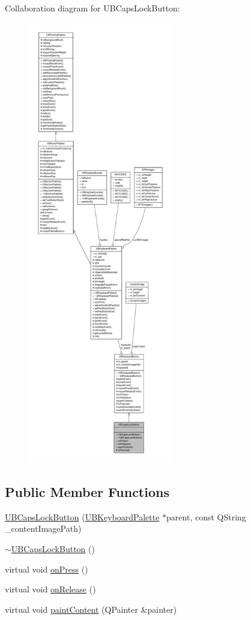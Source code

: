 Collaboration diagram for U\-B\-Caps\-Lock\-Button\-:
\nopagebreak
\begin{figure}[H]
\begin{center}
\leavevmode
\includegraphics[height=550pt]{db/dcd/class_u_b_caps_lock_button__coll__graph}
\end{center}
\end{figure}
\subsection*{Public Member Functions}
\begin{DoxyCompactItemize}
\item 
\hyperlink{class_u_b_caps_lock_button_a9f47840ffe36b462f52e9a4841357e2d}{U\-B\-Caps\-Lock\-Button} (\hyperlink{class_u_b_keyboard_palette}{U\-B\-Keyboard\-Palette} $\ast$parent, const Q\-String \-\_\-content\-Image\-Path)
\item 
\hyperlink{class_u_b_caps_lock_button_abbb3cad7eb8a461b63e0bab6a7cf0701}{$\sim$\-U\-B\-Caps\-Lock\-Button} ()
\item 
virtual void \hyperlink{class_u_b_caps_lock_button_a2ae615a22acf4dae0ef6e3debd7545ee}{on\-Press} ()
\item 
virtual void \hyperlink{class_u_b_caps_lock_button_a24c615fe29d8432f525e776b74e35170}{on\-Release} ()
\item 
virtual void \hyperlink{class_u_b_caps_lock_button_ae4af92e602737b6607e94fcd2d3a25f0}{paint\-Content} (Q\-Painter \&painter)
\end{DoxyCompactItemize}
